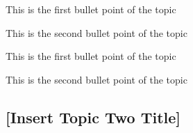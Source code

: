 \documentclass[../workbook]{subfiles}
\begin{document}



\begin{bullets}
    \item This is the first bullet point of the topic
    \item This is the second bullet point of the topic
\end{bullets}


\begin{numbers}
    \item This is the first bullet point of the topic
    \item This is the second bullet point of the topic
\end{numbers}


\subsection{[Insert Topic Two Title]}

\end{document}
